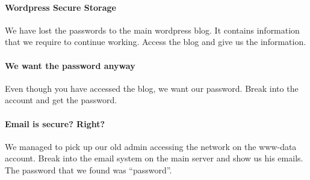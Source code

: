 				\paragraph{Wordpress Secure Storage}
					We have lost the passwords to the main wordpress blog.
					It contains information that we require to continue working.
					Access the blog and give us the information.

				\paragraph{We want the password anyway}
					Even though you have accessed the blog, we want our password.
					Break into the account and get the password.

				\paragraph{Email is secure? Right?}
					We managed to pick up our old admin accessing the network on the www-data account.
					Break into the email system on the main server and show us his emails.
					The password that we found was ``password''.

